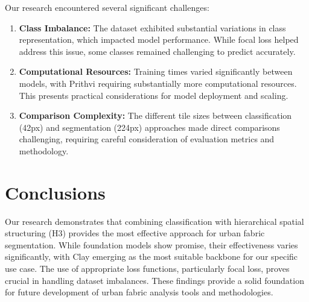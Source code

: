 \documentclass[
  letterpaper,
  DIV=11,
  numbers=noendperiod]{scrartcl}
\begin{document}
Our research encountered several significant challenges:

\begin{enumerate}
\def\labelenumi{\arabic{enumi}.}
\item
  \textbf{Class Imbalance:} The dataset exhibited substantial variations
  in class representation, which impacted model performance. While focal
  loss helped address this issue, some classes remained challenging to
  predict accurately.
\item
  \textbf{Computational Resources:} Training times varied significantly
  between models, with Prithvi requiring substantially more
  computational resources. This presents practical considerations for
  model deployment and scaling.
\item
  \textbf{Comparison Complexity:} The different tile sizes between
  classification (42px) and segmentation (224px) approaches made direct
  comparisons challenging, requiring careful consideration of evaluation
  metrics and methodology.
\end{enumerate}

\section{Conclusions}\label{conclusions}

Our research demonstrates that combining classification with
hierarchical spatial structuring (H3) provides the most effective
approach for urban fabric segmentation. While foundation models show
promise, their effectiveness varies significantly, with Clay emerging as
the most suitable backbone for our specific use case. The use of
appropriate loss functions, particularly focal loss, proves crucial in
handling dataset imbalances. These findings provide a solid foundation
for future development of urban fabric analysis tools and methodologies.
\end{document}
